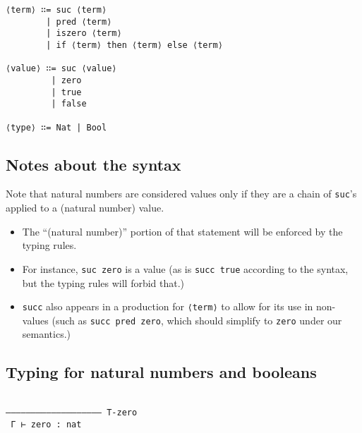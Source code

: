 \documentclass[11pt]{article}
\theoremstyle{definition}
\begin{document}
\begin{verbatim}
⟨term⟩ ∷= suc ⟨term⟩
        | pred ⟨term⟩
        | iszero ⟨term⟩
        | if ⟨term⟩ then ⟨term⟩ else ⟨term⟩

⟨value⟩ ∷= suc ⟨value⟩
         | zero
         | true
         | false

⟨type⟩ ∷= Nat | Bool
\end{verbatim}

\subsection{Notes about the syntax}
\label{sec:orga97d85e}

\iffalse
\begin{verbatim}
⟨term⟩ ∷= suc ⟨term⟩
        | pred ⟨term⟩
        | iszero ⟨term⟩
        | if ⟨term⟩ then ⟨term⟩ else ⟨term⟩

⟨value⟩ ∷= suc ⟨value⟩
         | zero
         | true
         | false

⟨type⟩ ∷= Nat | Bool
\end{verbatim}
\fi

Note that natural numbers are considered values only if
they are a chain of \texttt{suc}'s applied to a (natural number) value.
\begin{itemize}
\item The “(natural number)” portion of that statement will be
enforced by the typing rules.
\item For instance, \texttt{suc zero} is a value
(as is \texttt{succ true} according to the syntax,
but the typing rules will forbid that.)
\item \texttt{succ} also appears in a production for \texttt{⟨term⟩} to allow for its use in non-values
(such as \texttt{succ pred zero}, which should simplify to \texttt{zero} under our semantics.)
\end{itemize}

\subsection{Typing for natural numbers and booleans}
\label{sec:org86b6e55}

\begin{verbatim}
                               
––––––––––––––––––– T-zero     
 Γ ⊢ zero : nat
 
\end{verbatim}
\end{document}
